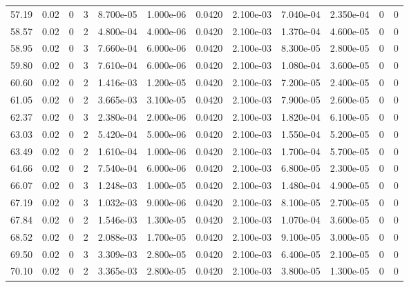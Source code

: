 \documentclass[preview]{standalone}
\begin{document}
{{{\begin{tabular}{L{1.2cm}C{1.2cm} C{0.3cm}C{0.5cm} C{1.4cm}C{1.4cm} C{1.4cm}C{1.4cm} C{1.6cm}C{1.6cm} C{1.6cm}C{1.6cm}}
  57.19  &  0.02  & 0     &  3 &  8.700e-05  & 1.000e-06  &  0.0420&   2.100e-03& 7.040e-04 & 2.350e-04   &  0 & 0  \\ 
  58.57  &  0.02  & 0     &  2 &  4.800e-04  & 4.000e-06  &  0.0420&   2.100e-03& 1.370e-04 & 4.600e-05   &  0 & 0  \\ 
  58.95  &  0.02  & 0     &  3 &  7.660e-04  & 6.000e-06  &  0.0420&   2.100e-03& 8.300e-05 & 2.800e-05   &  0 & 0  \\ 
  59.80  &  0.02  & 0     &  3 &  7.610e-04  & 6.000e-06  &  0.0420&   2.100e-03& 1.080e-04 & 3.600e-05   &  0 & 0  \\ 
  60.60  &  0.02  & 0     &  2 &  1.416e-03  & 1.200e-05  &  0.0420&   2.100e-03& 7.200e-05 & 2.400e-05   &  0 & 0  \\ 
  61.05  &  0.02  & 0     &  2 &  3.665e-03  & 3.100e-05  &  0.0420&   2.100e-03& 7.900e-05 & 2.600e-05   &  0 & 0  \\ 
  62.37  &  0.02  & 0     &  3 &  2.380e-04  & 2.000e-06  &  0.0420&   2.100e-03& 1.820e-04 & 6.100e-05   &  0 & 0  \\ 
  63.03  &  0.02  & 0     &  2 &  5.420e-04  & 5.000e-06  &  0.0420&   2.100e-03& 1.550e-04 & 5.200e-05   &  0 & 0  \\ 
  63.49  &  0.02  & 0     &  2 &  1.610e-04  & 1.000e-06  &  0.0420&   2.100e-03& 1.700e-04 & 5.700e-05   &  0 & 0  \\ 
  64.66  &  0.02  & 0     &  2 &  7.540e-04  & 6.000e-06  &  0.0420&   2.100e-03& 6.800e-05 & 2.300e-05   &  0 & 0  \\ 
  66.07  &  0.02  & 0     &  3 &  1.248e-03  & 1.000e-05  &  0.0420&   2.100e-03& 1.480e-04 & 4.900e-05   &  0 & 0  \\ 
  67.19  &  0.02  & 0     &  3 &  1.032e-03  & 9.000e-06  &  0.0420&   2.100e-03& 8.100e-05 & 2.700e-05   &  0 & 0  \\ 
  67.84  &  0.02  & 0     &  2 &  1.546e-03  & 1.300e-05  &  0.0420&   2.100e-03& 1.070e-04 & 3.600e-05   &  0 & 0  \\ 
  68.52  &  0.02  & 0     &  2 &  2.088e-03  & 1.700e-05  &  0.0420&   2.100e-03& 9.100e-05 & 3.000e-05   &  0 & 0  \\ 
  69.50  &  0.02  & 0     &  3 &  3.309e-03  & 2.800e-05  &  0.0420&   2.100e-03& 6.400e-05 & 2.100e-05   &  0 & 0  \\ 
  70.10  &  0.02  & 0     &  2 &  3.365e-03  & 2.800e-05  &  0.0420&   2.100e-03& 3.800e-05 & 1.300e-05   &  0 & 0  \\ 
\hline 
\end{tabular} 

}}}
\end{document}
